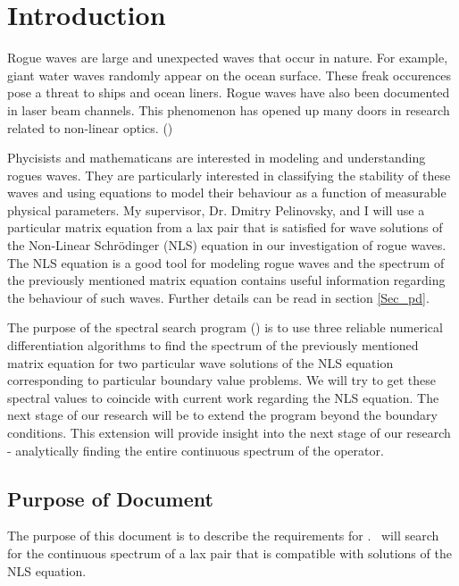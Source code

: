 \documentclass[12pt]{article}
\begin{document}
\newpage
\tableofcontents

\newpage 
\section{Introduction}

Rogue waves are large and unexpected waves that occur in nature. For example,  
giant water waves randomly appear on the ocean surface. These freak 
occurences pose a threat to ships and ocean liners. Rogue waves have also been 
documented in laser beam channels. 
This phenomenon has opened up many doors in research related to non-linear 
optics. (\cite{roguewaves})

Phycisists and mathematicans are interested in modeling and understanding 
rogues waves. They are particularly interested in classifying the stability of 
these waves and using equations to model their behaviour as a function of 
measurable physical parameters. My supervisor, Dr. Dmitry Pelinovsky, and I 
will use a particular matrix equation from a lax pair that is satisfied for 
wave 
solutions of the Non-Linear Schr\"{o}dinger (NLS) equation in our 
investigation of rogue waves. The NLS equation is a good tool for modeling 
rogue waves and the spectrum of the previously mentioned matrix equation 
contains useful information regarding the behaviour of such waves. Further 
details can be read in section \ref{Sec_pd}. 

The purpose of the spectral search program (\progname) is to use three 
reliable numerical differentiation algorithms to
find the spectrum of the previously mentioned matrix equation for two 
particular wave solutions of the NLS equation corresponding to particular 
boundary value problems. We will try to get these 
spectral 
values to coincide with current work regarding the NLS equation. The next stage 
of our research will be to extend the program beyond the 
boundary conditions. This 
extension will provide insight into the next stage of our research - 
analytically finding the entire continuous spectrum of the operator. 

\subsection{Purpose of Document}
The purpose of this document is to describe the requirements for \progname. 
\progname \ will search for the 
continuous spectrum of a lax pair that is compatible with solutions 
of the NLS equation. 
\end{document}
